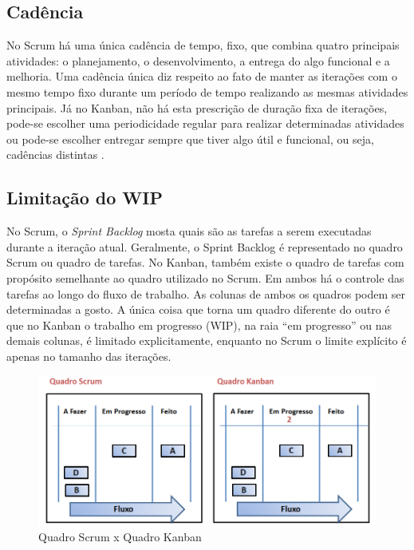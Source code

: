 \subsection[Cadência]{Cadência}

No Scrum há uma única cadência de tempo, fixo, que combina quatro principais atividades: o planejamento, o desenvolvimento, a entrega do algo funcional e a melhoria. Uma cadência única diz respeito ao fato de manter as iterações com o mesmo tempo fixo durante um período de tempo realizando as mesmas atividades principais. Já no Kanban, não há esta prescrição de duração fixa de iterações, pode-se escolher uma periodicidade regular para realizar determinadas atividades ou pode-se escolher entregar sempre que tiver algo útil e funcional, ou seja, cadências distintas  \cite{kniberg2009}. 

\subsection[Limitação do WIP]{Limitação do WIP}

No Scrum, o \textit{Sprint Backlog} mosta quais são as tarefas a serem executadas durante a iteração atual. Geralmente, o Sprint Backlog é representado no quadro Scrum ou quadro de tarefas. No Kanban, também existe o quadro de tarefas com propósito semelhante ao quadro utilizado no Scrum. Em ambos há o controle das tarefas ao longo do fluxo de trabalho. As colunas de ambos os quadros podem ser determinadas a gosto. A única coisa que torna um quadro diferente do outro é que no Kanban o trabalho em progresso (WIP), na raia “em progresso” ou nas demais colunas, é limitado explicitamente, enquanto no Scrum o limite explícito é apenas no tamanho das iterações. 

\begin{figure}[H]
		\centering
		\label{fig03}
			\includegraphics[scale=0.7]{figuras/quadros.png}
		\caption{Quadro Scrum x Quadro Kanban  \cite{kniberg2009}}
\end{figure}

